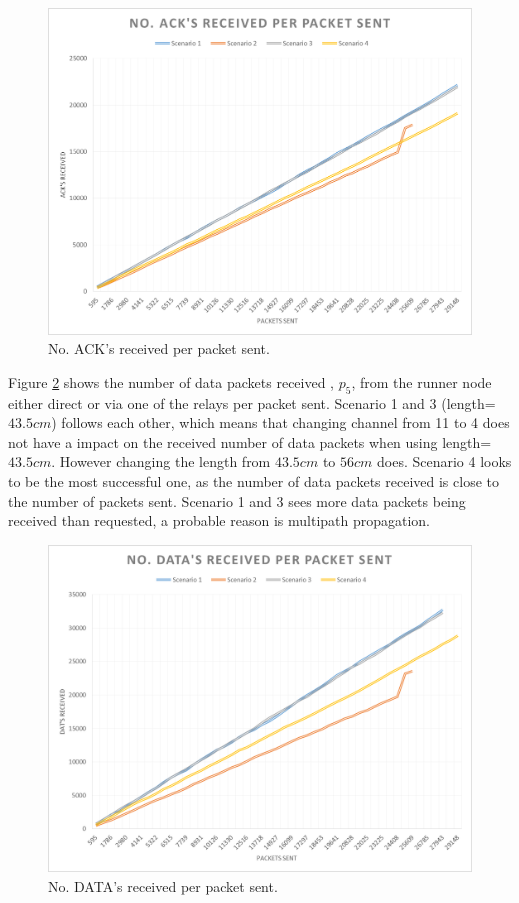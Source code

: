 \begin{figure}[h]
	\centering
	\includegraphics[width=1\linewidth]{results/NoAckReceived}
	\caption{No. ACK's received per packet sent.}
	\label{fig:noackreceived}
\end{figure}

\noindent Figure \ref{fig:nodatareceived} shows the number of data packets received , $p_5$, from the runner node either direct or via one of the relays per packet sent. Scenario 1 and 3 (length=$43.5cm$) follows each other, which means that changing channel from 11 to 4 does not have a impact on the received number of data packets when using length=$43.5cm$. However changing the length from $43.5cm$ to $56cm$ does. Scenario 4 looks to be the most successful one, as the number of data packets received is close to the number of packets sent. Scenario 1 and 3 sees more data packets being received than requested, a probable reason is multipath propagation.

\begin{figure}[h]
	\centering
	\includegraphics[width=1\linewidth]{results/NoDataReceived}
	\caption{No. DATA's received per packet sent.}
	\label{fig:nodatareceived}
\end{figure}

